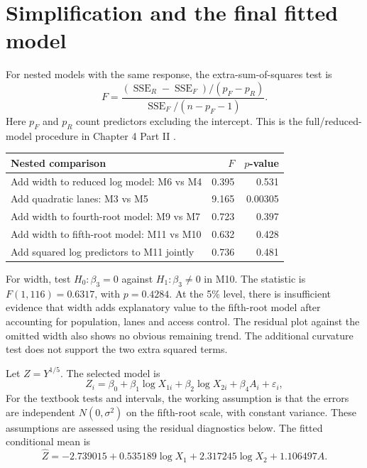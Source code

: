 \documentclass[11pt,a4paper]{article}
\begin{document}
\section{Simplification and the final fitted model}
For nested models with the same response, the extra-sum-of-squares test is
\[
F=\frac{(\operatorname{SSE}_{R}-\operatorname{SSE}_{F})/(p_F-p_R)}
        {\operatorname{SSE}_{F}/(n-p_F-1)}.
\]
Here $p_F$ and $p_R$ count predictors excluding the intercept. This is the
full/reduced-model procedure in Chapter 4 Part II \cite{chapter4ii}.

\begin{center}
\begin{tabularx}{\linewidth}{@{}Yrr@{}}
\toprule Nested comparison & $F$ & $p$-value\\ \midrule
Add width to reduced log model: M6 vs M4 & 0.395 & 0.531\\
Add quadratic lanes: M3 vs M5 & 9.165 & 0.00305\\
Add width to fourth-root model: M9 vs M7 & 0.723 & 0.397\\
Add width to fifth-root model: M11 vs M10 & 0.632 & 0.428\\
Add squared log predictors to M11 jointly & 0.736 & 0.481\\
\bottomrule
\end{tabularx}
\end{center}

For width, test $H_0:\beta_3=0$ against $H_1:\beta_3\ne0$ in M10.
The statistic is $F(1,116)=0.6317$, with $p=0.4284$.
At the 5\% level, there is insufficient evidence that width adds explanatory value
to the fifth-root model after accounting for population, lanes and access control.
The residual plot against the omitted width also shows no obvious remaining trend.
The additional curvature test does not support the two extra squared terms.

Let $Z=Y^{1/5}$. The selected model is
\[
Z_i=\beta_0+\beta_1\log X_{1i}+\beta_2\log X_{2i}+\beta_4 A_i+\varepsilon_i,
\]
For the textbook tests and intervals, the working assumption is that the errors
are independent $N(0,\sigma^2)$ on the fifth-root scale, with constant variance.
These assumptions are assessed using the residual diagnostics below.
The fitted conditional mean is
\[
\boxed{\widehat{Z}=-2.739015+0.535189\log X_1
          +2.317245\log X_2+1.106497A.}
\]
\end{document}
